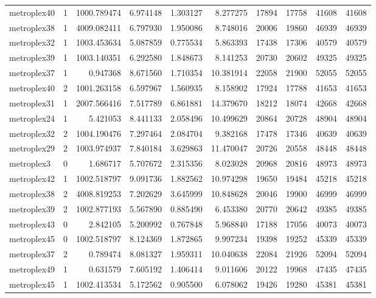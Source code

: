 \begin{longtable}{|l|r|r|r|r|r|r|r|r|r|}
metroplex40 & 1 & 1000.789474 & 6.974148 & 1.303127 & 8.277275 & 17894 & 17758 & 41608 & 41608 \\
metroplex38 & 1 & 4009.082411 & 6.797930 & 1.950086 & 8.748016 & 20006 & 19860 & 46939 & 46939 \\
metroplex32 & 1 & 1003.453634 & 5.087859 & 0.775534 & 5.863393 & 17438 & 17306 & 40579 & 40579 \\
metroplex39 & 1 & 1003.140351 & 6.292580 & 1.848673 & 8.141253 & 20730 & 20602 & 49325 & 49325 \\
metroplex37 & 1 & 0.947368 & 8.671560 & 1.710354 & 10.381914 & 22058 & 21900 & 52055 & 52055 \\
metroplex40 & 2 & 1001.263158 & 6.597967 & 1.560935 & 8.158902 & 17924 & 17788 & 41653 & 41653 \\
metroplex31 & 1 & 2007.566416 & 7.517789 & 6.861881 & 14.379670 & 18212 & 18074 & 42668 & 42668 \\
metroplex24 & 1 & 5.421053 & 8.441133 & 2.058496 & 10.499629 & 20864 & 20728 & 48904 & 48904 \\
metroplex32 & 2 & 1004.190476 & 7.297464 & 2.084704 & 9.382168 & 17478 & 17346 & 40639 & 40639 \\
metroplex29 & 2 & 1003.974937 & 7.840184 & 3.629863 & 11.470047 & 20726 & 20558 & 48448 & 48448 \\
metroplex3 & 0 & 1.686717 & 5.707672 & 2.315356 & 8.023028 & 20968 & 20816 & 48973 & 48973 \\
metroplex42 & 1 & 1002.518797 & 9.091736 & 1.882562 & 10.974298 & 19650 & 19484 & 45218 & 45218 \\
metroplex38 & 2 & 4008.819253 & 7.202629 & 3.645999 & 10.848628 & 20046 & 19900 & 46999 & 46999 \\
metroplex39 & 2 & 1002.877193 & 5.567890 & 0.885490 & 6.453380 & 20770 & 20642 & 49385 & 49385 \\
metroplex43 & 0 & 2.842105 & 5.200992 & 0.767848 & 5.968840 & 17188 & 17056 & 40073 & 40073 \\
metroplex45 & 0 & 1002.518797 & 8.124369 & 1.872865 & 9.997234 & 19398 & 19252 & 45339 & 45339 \\
metroplex37 & 2 & 0.789474 & 8.081327 & 1.959311 & 10.040638 & 22084 & 21926 & 52094 & 52094 \\
metroplex49 & 1 & 0.631579 & 7.605192 & 1.406414 & 9.011606 & 20122 & 19968 & 47435 & 47435 \\
metroplex45 & 1 & 1002.413534 & 5.172562 & 0.905500 & 6.078062 & 19426 & 19280 & 45381 & 45381 \\

\end{longtable}
